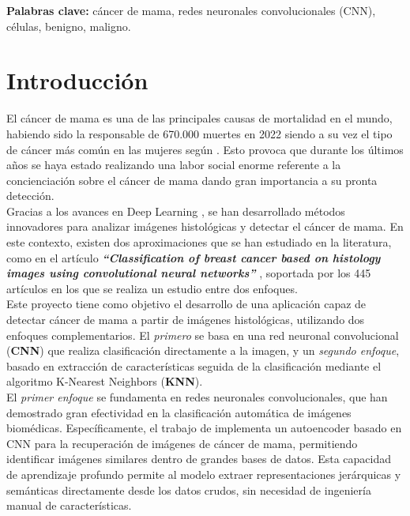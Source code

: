 \documentclass[12pt]{article} %
\begin{document}
\vspace{.5cm}

\textbf{Palabras clave:} cáncer de mama, redes neuronales convolucionales (CNN), células, benigno, maligno.

\newpage
\tableofcontents

\newpage

\section{Introducción}
El cáncer de mama es una de las principales causas de mortalidad en el mundo, habiendo sido la responsable de 670.000 muertes en 2022 siendo a su vez el tipo de cáncer más común en las mujeres según \cite{who_breast_cancer}. Esto provoca que durante los últimos años se haya estado realizando una labor social enorme referente a la concienciación sobre el cáncer de mama dando gran importancia a su pronta detección.\\

Gracias a los avances en Deep Learning \cite{shinde2018review}, se han desarrollado métodos innovadores para analizar imágenes histológicas y detectar el cáncer de mama. En este contexto, existen dos aproximaciones que se han estudiado en la literatura, como en el artículo \textit{\textbf{“Classification of breast cancer based on histology images using convolutional neural networks”}} \cite{bardou2018classification}, soportada por los 445 artículos en los que se realiza un estudio entre dos enfoques.\\

Este proyecto tiene como objetivo el desarrollo de una aplicación capaz de detectar cáncer de mama a partir de imágenes histológicas, utilizando dos enfoques complementarios. El \textit{primero} se basa en una red neuronal convolucional (\textbf{CNN}) que realiza clasificación directamente a la imagen, y un \textit{segundo enfoque}, basado en extracción de características seguida de la clasificación mediante el algoritmo K-Nearest Neighbors (\textbf{KNN}).\\

El \textit{primer enfoque} se fundamenta en redes neuronales convolucionales, que han demostrado gran efectividad en la clasificación automática de imágenes biomédicas. Específicamente, el trabajo de \cite{minarno2021cnn} implementa un autoencoder basado en CNN para la recuperación de imágenes de cáncer de mama, permitiendo identificar imágenes similares dentro de grandes bases de datos. Esta capacidad de aprendizaje profundo permite al modelo extraer representaciones jerárquicas y semánticas directamente desde los datos crudos, sin necesidad de ingeniería manual de características.
\end{document}

